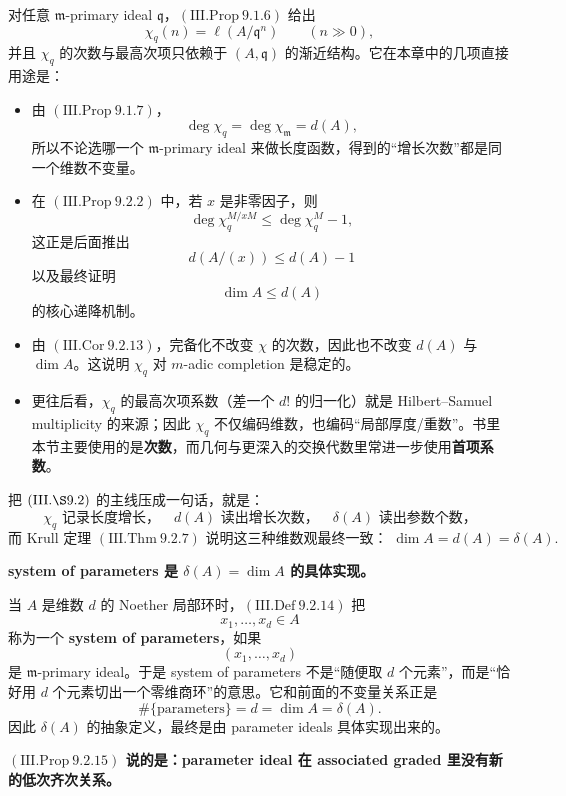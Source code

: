 \documentclass[a4paper]{ctexart}
\theoremstyle{definition}
\theoremstyle{analysis}
\theoremstyle{plain}
\begin{document}
对任意 \(\mathfrak m\)-primary ideal \(\mathfrak q\)，\((\mathrm{III.Prop}\ 9.1.6)\) 给出
\[
  \chi_q(n)=\ell(A/\mathfrak q^n)\qquad (n\gg 0),
\]
并且 \(\chi_q\) 的次数与最高次项只依赖于 \((A,\mathfrak q)\) 的渐近结构。它在本章中的几项直接用途是：
\begin{itemize}
  \item 由 \((\mathrm{III.Prop}\ 9.1.7)\)，
  \[
    \deg \chi_q=\deg \chi_{\mathfrak m}=d(A),
  \]
  所以不论选哪一个 \(\mathfrak m\)-primary ideal 来做长度函数，得到的“增长次数”都是同一个维数不变量。
  \item 在 \((\mathrm{III.Prop}\ 9.2.2)\) 中，若 \(x\) 是非零因子，则
  \[
    \deg \chi_q^{M/xM}\le \deg \chi_q^M-1,
  \]
  这正是后面推出
  \[
    d(A/(x))\le d(A)-1
  \]
  以及最终证明
  \[
    \dim A\le d(A)
  \]
  的核心递降机制。
  \item 由 \((\mathrm{III.Cor}\ 9.2.13)\)，完备化不改变 \(\chi\) 的次数，因此也不改变 \(d(A)\) 与 \(\dim A\)。这说明 \(\chi_q\) 对 \(m\)-adic completion 是稳定的。
  \item 更往后看，\(\chi_q\) 的最高次项系数（差一个 \(d!\) 的归一化）就是 Hilbert--Samuel multiplicity 的来源；因此 \(\chi_q\) 不仅编码维数，也编码“局部厚度/重数”。书里本节主要使用的是\textbf{次数}，而几何与更深入的交换代数里常进一步使用\textbf{首项系数}。
\end{itemize}

\medskip

把 \((\mathrm{III.\S 9.2})\) 的主线压成一句话，就是：
\[
  \chi_q \text{ 记录长度增长，}
  \quad
  d(A) \text{ 读出增长次数，}
  \quad
  \delta(A) \text{ 读出参数个数，}
\]
\[
  \text{而 Krull 定理 }(\mathrm{III.Thm}\ 9.2.7)\text{ 说明这三种维数观最终一致： }
  \dim A=d(A)=\delta(A).
\]

\medskip

\textbf{system of parameters 是 \(\delta(A)=\dim A\) 的具体实现。}

当 \(A\) 是维数 \(d\) 的 Noether 局部环时，\((\mathrm{III.Def}\ 9.2.14)\) 把
\[
  x_1,\dots,x_d\in A
\]
称为一个 \textbf{system of parameters}，如果
\[
  (x_1,\dots,x_d)
\]
是 \(\mathfrak m\)-primary ideal。于是 system of parameters 不是“随便取 \(d\) 个元素”，而是“恰好用 \(d\) 个元素切出一个零维商环”的意思。它和前面的不变量关系正是
\[
  \#\{\text{parameters}\}=d=\dim A=\delta(A).
\]
因此 \(\delta(A)\) 的抽象定义，最终是由 parameter ideals 具体实现出来的。

\medskip

\textbf{\((\mathrm{III.Prop}\ 9.2.15)\) 说的是：parameter ideal 在 associated graded 里没有新的低次齐次关系。}
\end{document}

